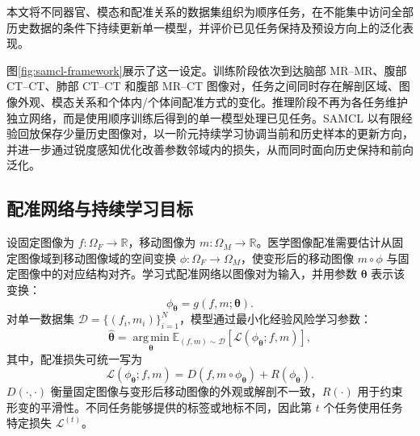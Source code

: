 本文将不同器官、模态和配准关系的数据集组织为顺序任务，在不能集中访问全部历史数据的条件下持续更新单一模型，并评价已见任务保持及预设方向上的泛化表现\cite{wang2024samcl}。

图\ref{fig:samcl-framework}展示了这一设定。训练阶段依次到达脑部 MR--MR、腹部 CT--CT、肺部 CT--CT 和腹部 MR--CT 图像对，任务之间同时存在解剖区域、图像外观、模态关系和个体内/个体间配准方式的变化。推理阶段不再为各任务维护独立网络，而是使用顺序训练后得到的单一模型处理已见任务。SAMCL 以有限经验回放保存少量历史图像对，以一阶元持续学习协调当前和历史样本的更新方向，并进一步通过锐度感知优化改善参数邻域内的损失，从而同时面向历史保持和前向泛化。


\subsection{配准网络与持续学习目标}
\label{subsec:samcl-registration-objective}

设固定图像为 $f:\Omega_F\rightarrow\mathbb{R}$，移动图像为 $m:\Omega_M\rightarrow\mathbb{R}$。医学图像配准需要估计从固定图像域到移动图像域的空间变换
$\phi:\Omega_F\rightarrow\Omega_M$，使变形后的移动图像
$m\circ\phi$ 与固定图像中的对应结构对齐。学习式配准网络以图像对为输入，并用参数 $\boldsymbol{\theta}$ 表示该变换：
\begin{equation}
\phi_{\boldsymbol{\theta}}
=
g(f,m;\boldsymbol{\theta}).
\label{eq:samcl-registration-network}
\end{equation}
对单一数据集 $\mathcal{D}=\{(f_i,m_i)\}_{i=1}^{N}$，模型通过最小化经验风险学习参数：
\begin{equation}
\widehat{\boldsymbol{\theta}}
=
\operatorname*{arg\,min}_{\boldsymbol{\theta}}
\mathbb{E}_{(f,m)\sim\mathcal{D}}
\left[
\mathcal{L}(\phi_{\boldsymbol{\theta}};f,m)
\right],
\label{eq:samcl-single-task-objective}
\end{equation}
其中，配准损失可统一写为
\begin{equation}
\mathcal{L}(\phi_{\boldsymbol{\theta}};f,m)
=
D\!\left(f,m\circ\phi_{\boldsymbol{\theta}}\right)
+
R\!\left(\phi_{\boldsymbol{\theta}}\right).
\label{eq:samcl-registration-loss}
\end{equation}
$D(\cdot,\cdot)$ 衡量固定图像与变形后移动图像的外观或解剖不一致，$R(\cdot)$ 用于约束形变的平滑性。不同任务能够提供的标签或地标不同，因此第 $t$ 个任务使用任务特定损失 $\mathcal{L}^{(t)}$。

